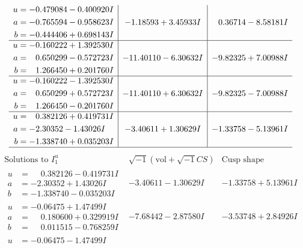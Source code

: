 \documentclass[1p]{elsarticle_modified}
\theoremstyle{definition}
\newcommand{\I}{\sqrt{-1}}
\begin{document}
$$\begin{array}{c|c|c}
\begin{aligned}
u &= -0.479084 - 0.400920 I \\
a &= -0.765594 - 0.958623 I \\
b &= -0.444406 + 0.698143 I\end{aligned}
 & -1.18593 + 3.45933 I & \phantom{-}0.36714 - 8.58181 I \\ \hline\begin{aligned}
u &= -0.160222 + 1.392530 I \\
a &= \phantom{-}0.650299 - 0.572723 I \\
b &= \phantom{-}1.266450 + 0.201760 I\end{aligned}
 & -11.40110 - 6.30632 I & -9.82325 + 7.00988 I \\ \hline\begin{aligned}
u &= -0.160222 - 1.392530 I \\
a &= \phantom{-}0.650299 + 0.572723 I \\
b &= \phantom{-}1.266450 - 0.201760 I\end{aligned}
 & -11.40110 + 6.30632 I & -9.82325 - 7.00988 I \\ \hline\begin{aligned}
u &= \phantom{-}0.382126 + 0.419731 I \\
a &= -2.30352 - 1.43026 I \\
b &= -1.338740 + 0.035203 I\end{aligned}
 & -3.40611 + 1.30629 I & -1.33758 - 5.13961 I\\
 \hline 
 \end{array}$$\newpage$$\begin{array}{c|c|c}  
\text{Solutions to }I^u_{1}& \I (\text{vol} + \sqrt{-1}CS) & \text{Cusp shape}\\
 \hline 
\begin{aligned}
u &= \phantom{-}0.382126 - 0.419731 I \\
a &= -2.30352 + 1.43026 I \\
b &= -1.338740 - 0.035203 I\end{aligned}
 & -3.40611 - 1.30629 I & -1.33758 + 5.13961 I \\ \hline\begin{aligned}
u &= -0.06475 + 1.47499 I \\
a &= \phantom{-}0.180600 + 0.329919 I \\
b &= \phantom{-}0.011515 - 0.768259 I\end{aligned}
 & -7.68442 - 2.87580 I & -3.53748 + 2.84926 I \\ \hline\begin{aligned}
u &= -0.06475 - 1.47499 I \\

\end{aligned}
\end{array}$$
\end{document}
